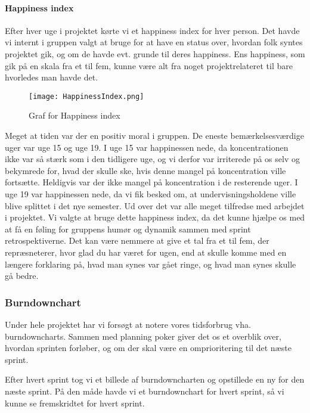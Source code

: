 \paragraph*{Happiness index}
Efter hver uge i projektet kørte vi et happiness index for hver person.
Det havde vi internt i gruppen valgt at bruge for at have en status over, hvordan folk syntes projektet gik, og om de havde evt. grunde til deres happiness.
Ens happiness, som gik på en skala fra et til fem, kunne være alt fra noget projektrelateret til bare hvorledes man havde det.

\begin{figure}[h]
    \caption{Graf for Happiness index}
    \centering
        \texttt{[image: HappinessIndex.png]}
    \label{happinessindex}
\end{figure}

Meget at tiden var der en positiv moral i gruppen.
De eneste bemærkelsesværdige uger var uge 15 og uge 19.
I uge 15 var happinessen nede, da koncentrationen ikke var så stærk som i den tidligere uge, og vi derfor var irriterede på os selv og bekymrede for, hvad der skulle ske, hvis denne mangel på koncentration ville fortsætte.
Heldigvis var der ikke mangel på koncentration i de resterende uger.
I uge 19 var happinessen nede, da vi fik besked om, at undervisningsholdene ville blive splittet i det nye semester.
Ud over det var alle meget tilfredse med arbejdet i projektet.
Vi valgte at bruge dette happiness index, da det kunne hjælpe os med at få en føling for gruppens humør og dynamik sammen med sprint retrospektiverne.
Det kan være nemmere at give et tal fra et til fem, der repræsneterer, hvor glad du har været for ugen, end at skulle komme med en længere forklaring på, hvad man synes var gået ringe, og hvad man synes skulle gå bedre.

\subsubsection{Burndownchart}

Under hele projektet har vi forsøgt at notere vores tidsforbrug vha. burndowncharts.
Sammen med planning poker giver det os et overblik over, hvordan sprinten forløber, og om der skal være en omprioritering til det næste sprint. 

Efter hvert sprint tog vi et billede af burndowncharten og opstillede en ny for den næste sprint.
På den måde havde vi et burndownchart for hvert sprint, så vi kunne se fremskridtet for hvert sprint.

